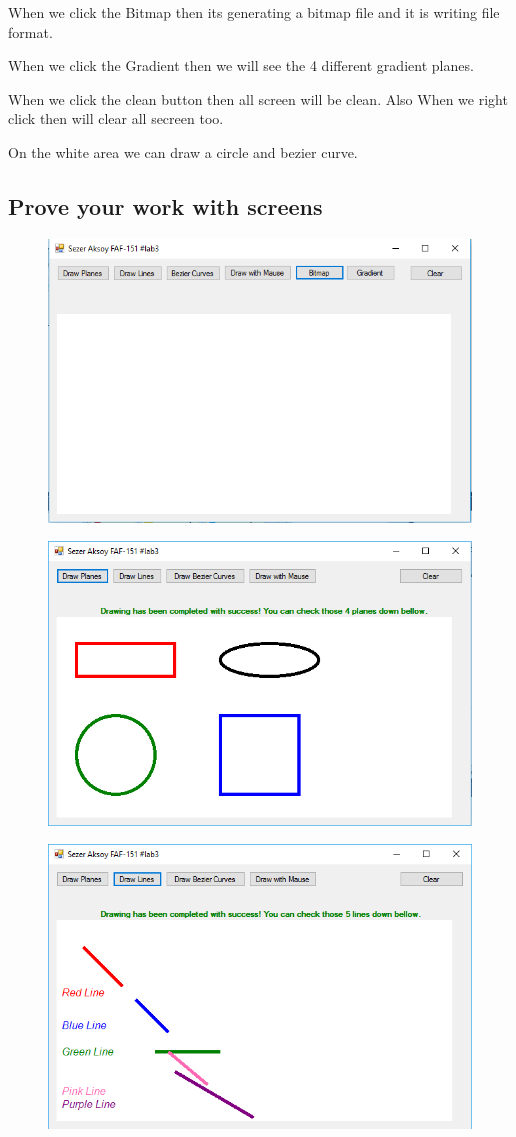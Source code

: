 When we click the Bitmap then its generating a bitmap file and it is writing file format.

When we click the Gradient then we will see the 4 different gradient planes.
	
When we click the clean button then all screen will be clean.
Also When we right click then will clear all secreen too.

On the white area we can draw a circle and bezier curve.


\subsection{Prove your work with screens}

\begin{figure}
	\centering
	\includegraphics[width=0.7\linewidth]{../../LAB3/img/1}
	\caption{}
	\label{fig:1}
\end{figure}

\begin{figure}
	\centering
	\includegraphics[width=0.7\linewidth]{../../LAB3/img/2}
	\caption{}
	\label{fig:2}
\end{figure}

\begin{figure}
	\centering
	\includegraphics[width=0.7\linewidth]{../../LAB3/img/3}
	\caption{}
	\label{fig:3}
\end{figure}



